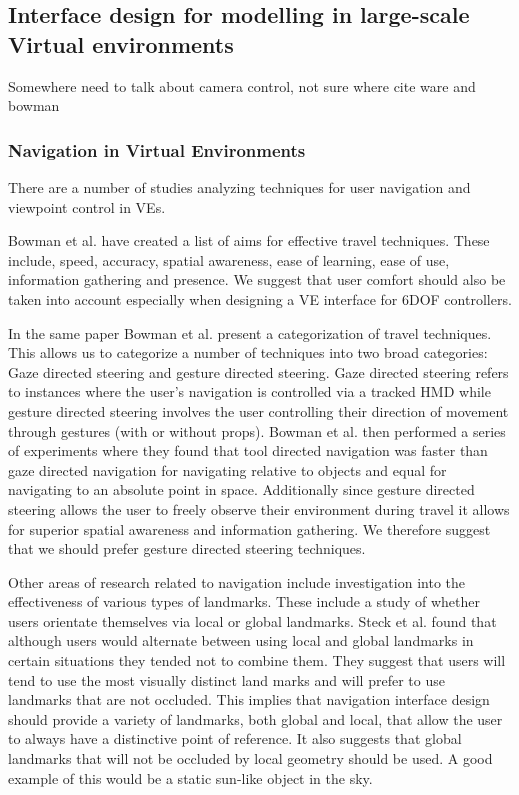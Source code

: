 \documentclass{sig-alternate-05-2015}
\begin{document}
\subsection{Interface design for modelling in large-scale Virtual environments}
Somewhere need to talk about camera control, not sure where cite ware and bowman
\subsubsection{Navigation in Virtual Environments}
There are a number of studies analyzing techniques for user navigation and viewpoint control in VEs.

Bowman et al. have created a list of aims for effective travel techniques.\cite{Bowman1997} These include, speed, accuracy, spatial awareness, ease of learning, ease of use, information gathering and presence. We suggest that user comfort should also be taken into account especially when designing a VE interface for 6DOF controllers.

 In the same paper Bowman et al. present a categorization of travel techniques\cite{Bowman1997}. This allows us to categorize a number of techniques into two broad categories: Gaze directed steering and gesture directed steering. Gaze directed steering refers to instances where the user's navigation is controlled via a tracked HMD while gesture directed  steering involves the user controlling their direction of movement through gestures (with or without props). Bowman et al. then performed a series of experiments where they found that tool directed navigation was faster than gaze directed navigation for navigating relative to objects and equal for navigating to an absolute point in space. Additionally since gesture directed steering allows the user to freely observe their environment during travel it allows for superior spatial awareness and information gathering. We therefore suggest that we should prefer gesture directed steering techniques.

Other areas of research related to navigation include investigation into the effectiveness of various types of landmarks. These include a study of whether users orientate themselves via local or global landmarks\cite{Steck2000}. Steck et al. found that although users would alternate between using local and global landmarks in certain situations they tended not to combine them. They suggest that users will tend to use the most visually distinct land marks and will prefer to use landmarks that are not occluded. This implies that navigation interface design should provide a variety of landmarks, both global and local, that allow the user to always have a distinctive point of reference. It also suggests that global landmarks that will not be occluded by local geometry should be used. A good example of this would be a static sun-like object in the sky.
\end{document}
